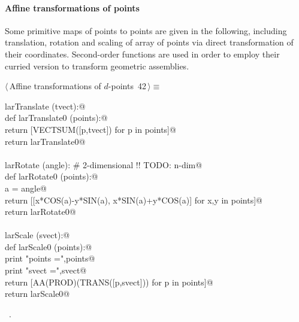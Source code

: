 \documentclass[11pt,oneside]{article}	%
\begin{document}
\paragraph{Affine transformations of points} Some primitive maps of points to points are given in the following, including translation, rotation and scaling of array of points via direct transformation of their coordinates. Second-order functions are used in order to employ their curried version to transform geometric assemblies.

\begin{flushleft} \small \label{scrap69}
\protect{}$\langle\,$Affine transformations of $d$-points\nobreak\ {\footnotesize 42}$\,\rangle\equiv$
\vspace{-1ex}
\begin{list}{}{} \item
\mbox{}\verb@def larTranslate (tvect):@\\
\mbox{}\verb@   def larTranslate0 (points):@\\
\mbox{}\verb@      return [VECTSUM([p,tvect]) for p in points]@\\
\mbox{}\verb@   return larTranslate0@\\
\mbox{}\verb@@\\
\mbox{}\verb@def larRotate (angle):     # 2-dimensional !! TODO: n-dim@\\
\mbox{}\verb@   def larRotate0 (points):@\\
\mbox{}\verb@      a = angle@\\
\mbox{}\verb@      return [[x*COS(a)-y*SIN(a), x*SIN(a)+y*COS(a)] for x,y in points]@\\
\mbox{}\verb@   return larRotate0@\\
\mbox{}\verb@@\\
\mbox{}\verb@def larScale (svect):@\\
\mbox{}\verb@   def larScale0 (points):@\\
\mbox{}\verb@      print "\n points =",points@\\
\mbox{}\verb@      print "\n svect =",svect@\\
\mbox{}\verb@      return [AA(PROD)(TRANS([p,svect])) for p in points]@\\
\mbox{}\verb@   return larScale0@\\
\mbox{}\verb@@{\NWsep}
\end{list}
\vspace{-1ex}
\footnotesize\addtolength{\baselineskip}{-1ex}
\begin{list}{}{\setlength{\itemsep}{-\parsep}\setlength{\itemindent}{-\leftmargin}}
\item \NWtxtMacroRefIn\ .
\end{list}
\end{flushleft}
\end{document}
